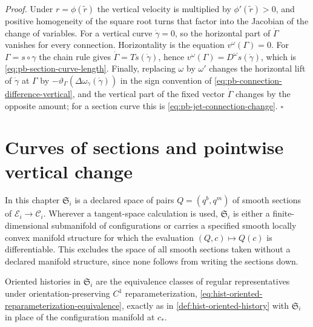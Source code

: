 \noindent\emph{Proof.}
Under \(r=\phi(\tilde r)\) the vertical velocity is multiplied by
\(\phi'(\tilde r)>0\), and positive homogeneity of the square root turns that
factor into the Jacobian of the change of variables. For a vertical curve
\(\dot\gamma=0\), so the horizontal part of \(\dot\Gamma\) vanishes for every
connection. Horizontality is the equation \(v^\omega(\Gamma)=0\). For
\(\Gamma=s\circ\gamma\) the chain rule gives
\(\dot\Gamma=Ts(\dot\gamma)\), hence
\(v^\omega(\Gamma)=D^\omega s(\dot\gamma)\), which is
\eqref{eq:pb-section-curve-length}. Finally, replacing \(\omega\) by
\(\omega'\) changes the horizontal lift of \(\dot\gamma\) at \(\Gamma\) by
\(-\vartheta_\Gamma(\Delta\omega_\gamma(\dot\gamma))\) in the sign convention
of \eqref{eq:pb-connection-difference-vertical}, and the vertical part of the
fixed vector \(\dot\Gamma\) changes by the opposite amount; for a section curve
this is \eqref{eq:pb-jet-connection-change}. \(\square\)

\section{Curves of sections and pointwise vertical change}
\label{sec:hist-section-curves}

In this chapter \(\mathfrak S_i\) is a declared space of pairs
\(Q=(q^b,q^m)\) of smooth sections of \(\mathcal E_i\to\mathcal C_i\). Wherever a
tangent-space calculation is used, \(\mathfrak S_i\) is either a
finite-dimensional submanifold of configurations or carries a specified smooth
locally convex manifold structure for which the evaluation
\((Q,c)\mapsto Q(c)\) is differentiable. This excludes the space of all smooth
sections taken without a declared manifold structure, since none follows from
writing the sections down.

Oriented histories in \(\mathfrak S_i\) are the equivalence classes of regular
representatives under orientation-preserving \(C^1\) reparameterization,
\eqref{eq:hist-oriented-reparameterization-equivalence}, exactly as in
\cref{def:hist-oriented-history} with \(\mathfrak S_i\) in place of the
configuration manifold at \(c_*\).

